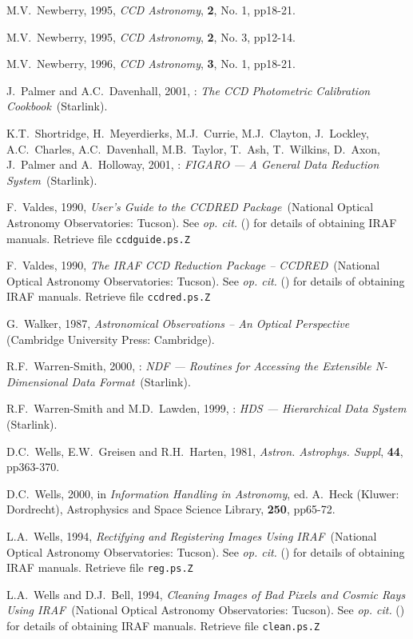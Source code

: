 \documentclass[twoside,11pt]{starlink}
\begin{document}
\begin{thebibliography}{99}
   M.V.~Newberry, 1995, \textit{CCD Astronomy},
   \textbf{2}, No. 1, pp18-21.

   M.V.~Newberry, 1995, \textit{CCD Astronomy},
   \textbf{2}, No. 3, pp12-14.

   M.V.~Newberry, 1996, \textit{CCD Astronomy},
   \textbf{3}, No. 1, pp18-21.

   J.~Palmer and A.C.~Davenhall, 2001, :
   \textit{The CCD Photometric Calibration Cookbook}\, (Starlink).

   K.T.~Shortridge, H.~Meyerdierks, M.J.~Currie,
   M.J.~Clayton, J.~Lockley, A.C.~Charles, A.C.~Davenhall, M.B.~Taylor,
   T.~Ash, T.~Wilkins, D.~Axon, J.~Palmer and A.~Holloway,
   2001, : \textit{FIGARO --- A General Data
   Reduction System}\, (Starlink).

   F.~Valdes, 1990, \textit{User's Guide to the CCDRED
   Package}\, (National Optical Astronomy Observatories: Tucson).  See
    \textit{op. cit.}\/ (\cite{SG12}) for details of
   obtaining IRAF manuals.  Retrieve file \texttt{ccdguide.ps.Z}

   F.~Valdes, 1990, \textit{The IRAF CCD Reduction
   Package -- CCDRED}\, (National Optical Astronomy Observatories: Tucson).
   See  \textit{op. cit.}\/ (\cite{SG12}) for details of
   obtaining IRAF manuals.  Retrieve file \texttt{ccdred.ps.Z}

   G.~Walker, 1987, \textit{Astronomical Observations
   -- An Optical Perspective}\, (Cambridge University Press: Cambridge).

   R.F.~Warren-Smith, 2000, : \textit{NDF --- Routines for Accessing the Extensible N-Dimensional Data
   Format}\, (Starlink).

   R.F.~Warren-Smith and M.D.~Lawden, 1999,
   : \textit{HDS --- Hierarchical Data System}\,
   (Starlink).

   D.C.~Wells, E.W.~Greisen and R.H.~Harten, 1981,
   \textit{Astron. Astrophys. Suppl}, \textbf{44}, pp363-370.

   D.C.~Wells, 2000, in \textit{Information Handling in
   Astronomy}, ed. A.~Heck (Kluwer: Dordrecht), Astrophysics and Space
   Science Library, \textbf{250}, pp65-72.

   L.A.~Wells, 1994, \textit{Rectifying and Registering
   Images Using IRAF}\, (National Optical Astronomy Observatories: Tucson).
   See  \textit{op. cit.}\/ (\cite{SG12}) for details of
   obtaining IRAF manuals.  Retrieve file \texttt{reg.ps.Z}

   L.A.~Wells and D.J.~Bell, 1994, \textit{Cleaning
   Images of Bad Pixels and Cosmic Rays Using IRAF}\, (National Optical
   Astronomy Observatories: Tucson).  See  \textit{op.
   cit.}\/ (\cite{SG12}) for details of obtaining IRAF manuals.  Retrieve
   file \texttt{clean.ps.Z}

\end{thebibliography}
\end{document}
